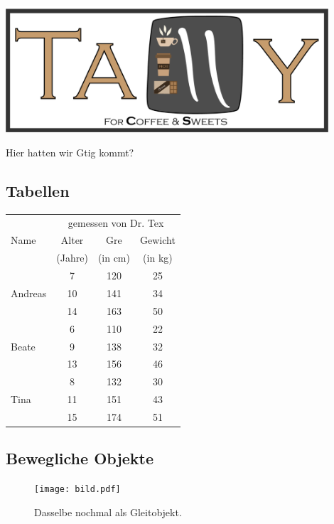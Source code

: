 \documentclass[11pt,a4paper]{article} %
\begin{document}
\begin{center}
\includegraphics[width=12cm]{TallyLogo.png}
\end{center}

Hier hatten wir Gtig kommt?

\subsection{Tabellen}
\label{Tabellen}



\begin{center}
\begin{tabular}{|l||c|c|c|}
\hline
           & \multicolumn{3}{|c|}{gemessen von Dr. Tex} \\
\cline{2-4}
Name       &  Alter    & Gre   & Gewicht \\
           &  (Jahre)  & (in cm) & (in kg) \\
\hline
\hline
           &   7       &  120    &  25     \\
\cline{2-4}
Andreas    &   10      &  141    &  34     \\
\cline{2-4}
           &   14      &  163    &  50     \\
\hline
           &   6       &  110    &  22     \\
\cline{2-4}
Beate      &   9       &  138    &  32     \\
\cline{2-4}
           &   13      &  156    &  46     \\
\hline
           &   8       &  132    &  30     \\
\cline{2-4}
Tina       &   11      &  151    &  43     \\
\cline{2-4}
           &   15      &  174    &  51     \\
\hline
\end{tabular}
\end{center}

\subsection{Bewegliche Objekte}
\label{Floats}


\begin{figure}[h]
\begin{center}
\texttt{[image: bild.pdf]}
\caption{Dasselbe nochmal als Gleitobjekt. \label{bild}}
\end{center}
\end{figure}
\newpage
\newpage
\begin{center}


\end{center}
\end{document}
